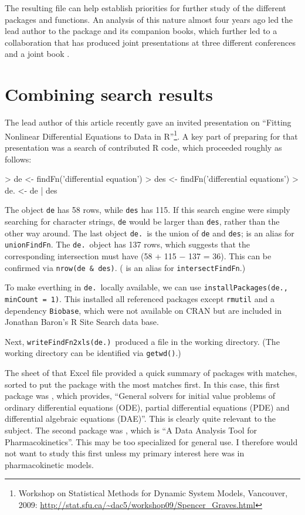 \documentclass[a4paper]{report}
\begin{document}
\begin{article}
The resulting  file can help establish priorities
for further study of the different packages and functions.  An
analysis of this nature almost four years ago led the lead author
to the  package and its companion books, which further
led to a collaboration that has produced joint presentations at
three different conferences and a joint book \citep{RHG09}.

\section{Combining search results}

The lead author of this article recently gave an invited presentation
on ``Fitting Nonlinear Differential Equations to Data in R''\footnote{Workshop
on Statistical Methods for Dynamic System Models, Vancouver, 2009: \url{http://stat.sfu.ca/~dac5/workshop09/Spencer_Graves.html}}.
A key part of preparing for that presentation was a search of
contributed R code, which proceeded roughly as follows:

\begin{Schunk}
\begin{Sinput}
> de <- findFn('differential equation')
> des <- findFn('differential equations')
> de. <- de | des
\end{Sinput}
\end{Schunk}

The object {\tt de} has 58 rows, while {\tt des} has 115.
If this search engine were simply searching for character
strings, {\tt de} would be larger than {\tt des}, rather than
the other way around.  The last object {\tt de.}\ is the union
of {\tt de} and {\tt des};  \samp{|} is an alias for {\tt unionFindFn}.
The {\tt de.}\ object has 137 rows, which suggests that
the corresponding intersection must have (58 + 115 $-$ 137 = 36). This can be confirmed via {\tt nrow(de \& des)}.
(\samp{\&} is an alias for {\tt intersectFindFn}.)

To make everthing in {\tt de.}\ locally available, we can use
{\tt installPackages(de., minCount = 1)}.  This installed all
referenced packages except {\tt rmutil} and a dependency {\tt Biobase},
which were not available on CRAN but are included in Jonathan
Baron's R Site Search data base.

Next, {\tt writeFindFn2xls(de.)}\ produced a file 
in the working directory.  (The working directory can be
identified via {\tt getwd()}.)

The  sheet of that Excel file provided a quick
summary of packages with matches, sorted to put the package
with the most matches first.  In this case, this first package
was , which provides, ``General solvers for initial
value problems of ordinary differential equations (ODE),
partial differential equations (PDE) and differential
algebraic equations (DAE)''.  This is clearly quite relevant
to the subject.  The second package was , which
is ``A Data Analysis Tool for Pharmacokinetics''.  This may
be too specialized for general use.  I therefore would not
want to study this first unless my primary interest here was in
pharmacokinetic models.


\end{article}
\end{document}
